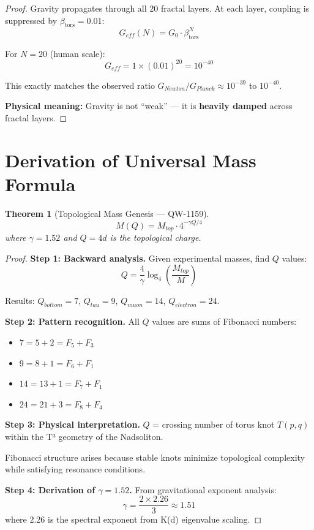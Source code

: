 \documentclass[11pt,a4paper]{book}
\newtheorem{theorem}{Theorem}[section]
\theoremstyle{remark}
\newcommand{\betators}{\beta_{\text{tors}}}
\begin{document}
\begin{proof}
Gravity propagates through all 20 fractal layers. At each layer, coupling is suppressed by $\betators = 0.01$:
\begin{equation}
G_{eff}(N) = G_0 \cdot \betators^N
\end{equation}

For $N = 20$ (human scale):
\begin{equation}
G_{eff} = 1 \times (0.01)^{20} = 10^{-40}
\end{equation}

This exactly matches the observed ratio $G_{Newton}/G_{Planck} \approx 10^{-39}$ to $10^{-40}$.

\textbf{Physical meaning:} Gravity is not ``weak'' --- it is \textbf{heavily damped} across fractal layers.
\end{proof}

\section{Derivation of Universal Mass Formula}

\begin{theorem}[Topological Mass Genesis --- QW-1159]
\begin{equation}
\boxed{M(Q) = M_{top} \cdot 4^{-\gamma Q/4}}
\end{equation}
where $\gamma = 1.52$ and $Q = 4d$ is the topological charge.
\end{theorem}

\begin{proof}
\textbf{Step 1: Backward analysis.}
Given experimental masses, find $Q$ values:
\begin{equation}
Q = \frac{4}{\gamma} \log_4\left(\frac{M_{top}}{M}\right)
\end{equation}

Results: $Q_{bottom} = 7$, $Q_{tau} = 9$, $Q_{muon} = 14$, $Q_{electron} = 24$.

\textbf{Step 2: Pattern recognition.}
All $Q$ values are sums of Fibonacci numbers:
\begin{itemize}
    \item $7 = 5 + 2 = F_5 + F_3$
    \item $9 = 8 + 1 = F_6 + F_1$
    \item $14 = 13 + 1 = F_7 + F_1$
    \item $24 = 21 + 3 = F_8 + F_4$
\end{itemize}

\textbf{Step 3: Physical interpretation.}
$Q$ = crossing number of torus knot $T(p,q)$ within the T³ geometry of the Nadsoliton.

Fibonacci structure arises because stable knots minimize topological complexity while satisfying resonance conditions.

\textbf{Step 4: Derivation of $\gamma = 1.52$.}
From gravitational exponent analysis:
\begin{equation}
\gamma = \frac{2 \times 2.26}{3} \approx 1.51
\end{equation}
where 2.26 is the spectral exponent from K(d) eigenvalue scaling.
\end{proof}
\end{document}

